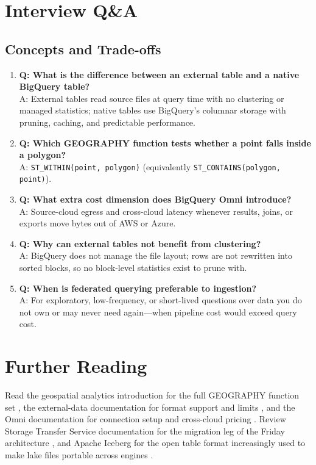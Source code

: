 \section{Interview Q\&A}
\subsection{Concepts and Trade-offs}
\begin{enumerate}
    \item \textbf{Q: What is the difference between an external table and a native BigQuery table?}\\
    A: External tables read source files at query time with no clustering or managed statistics; native tables use BigQuery's columnar storage with pruning, caching, and predictable performance.

    \item \textbf{Q: Which GEOGRAPHY function tests whether a point falls inside a polygon?}\\
    A: \texttt{ST\_WITHIN(point, polygon)} (equivalently \texttt{ST\_CONTAINS(polygon, point)}).

    \item \textbf{Q: What extra cost dimension does BigQuery Omni introduce?}\\
    A: Source-cloud egress and cross-cloud latency whenever results, joins, or exports move bytes out of AWS or Azure.

    \item \textbf{Q: Why can external tables not benefit from clustering?}\\
    A: BigQuery does not manage the file layout; rows are not rewritten into sorted blocks, so no block-level statistics exist to prune with.

    \item \textbf{Q: When is federated querying preferable to ingestion?}\\
    A: For exploratory, low-frequency, or short-lived questions over data you do not own or may never need again---when pipeline cost would exceed query cost.
\end{enumerate}

\section{Further Reading}
Read the geospatial analytics introduction for the full GEOGRAPHY function set \cite{googlecloudbigquerygis}, the external-data documentation for format support and limits \cite{googlecloudbigqueryexternal}, and the Omni documentation for connection setup and cross-cloud pricing \cite{googlecloudbigqueryomni}. Review Storage Transfer Service documentation for the migration leg of the Friday architecture \cite{googlecloudstoragetransfer}, and Apache Iceberg for the open table format increasingly used to make lake files portable across engines \cite{apacheiceberg}.


